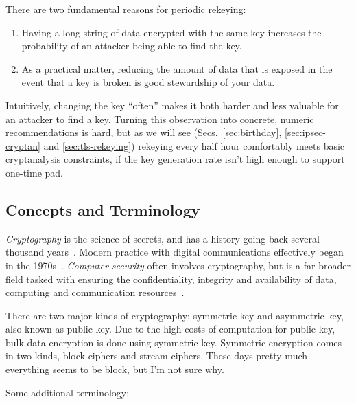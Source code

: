 There are two fundamental reasons for periodic rekeying:

\begin{enumerate}
\item Having a long string of data encrypted with the same key increases
the probability of an attacker being able to find the key.
\item As a practical matter, reducing the amount of data that is exposed
in the event that a key is broken is good stewardship of your data.
\end{enumerate}

Intuitively, changing the key ``often'' makes it both harder and less
valuable for an attacker to find a key.  Turning this observation into
concrete, numeric recommendations is hard, but as we will see
(Secs.~\ref{sec:birthday}, \ref{sec:ipsec-cryptan} and
\ref{sec:tls-rekeying}) rekeying every half hour comfortably meets
basic cryptanalysis constraints, if the key generation rate isn't high
enough to support one-time pad.

\subsection{Concepts and Terminology}

\emph{Cryptography} is the science of secrets, and has a history going
back several thousand years~\cite{kahn1996codebreakers,singh1999code}.
Modern practice with digital communications effectively began in the
1970s~\cite{schneier96:_applied_crypto,menezes1996handbook}.
\emph{Computer security} often involves cryptography, but is a far
broader field tasked with ensuring the confidentiality, integrity and
availability of data, computing and communication
resources~\cite{bishop2002art}.

There are two major kinds of cryptography: symmetric key and
asymmetric key, also known as public key.  Due to the high costs of
computation for public key, bulk data encryption is done using
symmetric key.  Symmetric encryption comes in two kinds, block ciphers
and stream ciphers.  These days pretty much everything seems to be
block, but I'm not sure why.  \aono{}

Some additional terminology:

